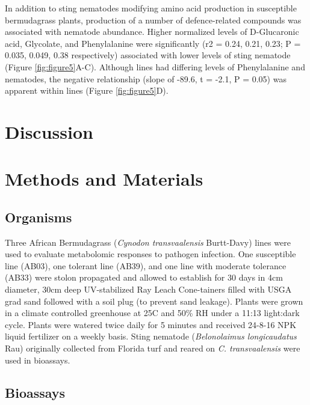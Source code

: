 \documentclass[9pt,lineno]{elife}
\begin{document}
In addition to sting nematodes modifying amino acid production in susceptible bermudagrass plants, production of a number of defence-related compounds was associated with nematode abundance.  Higher normalized levels of D-Glucaronic acid, Glycolate, and Phenylalanine were significantly (r2 = 0.24, 0.21, 0.23; P = 0.035, 0.049, 0.38 respectively) associated with lower levels of sting nematode (Figure \ref{fig:figure5}A-C).  Although lines had differing levels of Phenylalanine and nematodes, the negative relationship (slope of -89.6, t = -2.1, P = 0.05) was apparent within lines (Figure \ref{fig:figure5}D).  



\section{Discussion}


\section{Methods and Materials}


\subsection{Organisms}

Three African Bermudagrass (\textit{Cynodon transvaalensis} Burtt-Davy) lines were used to evaluate metabolomic responses to pathogen infection.  One susceptible line (AB03), one tolerant line (AB39), and one line with moderate tolerance (AB33) were stolon propagated and allowed to establish for 30 days in 4cm diameter, 30cm deep UV-stabilized Ray Leach Cone-tainers filled with USGA grad sand followed with a soil plug (to prevent sand leakage). Plants were grown in a climate controlled greenhouse at 25C and 50\% RH under a 11:13 light:dark cycle.  Plants were watered twice daily for 5 minutes and received 24-8-16 NPK liquid fertilizer on a weekly basis.  Sting nematode (\textit{Belonolaimus longicaudatus} Rau) originally collected from Florida turf and reared on \textit{C. transvaalensis} were used in bioassays. 

\subsection{Bioassays}
\end{document}
